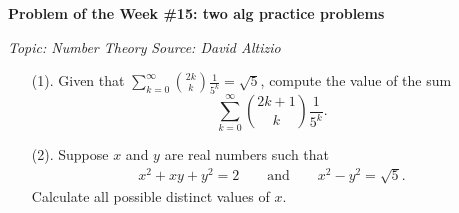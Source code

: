 \begin{potw}\vspace{5pt}
{\large\textbf{Problem of the Week \#15: two alg practice problems}}\vspace{5pt}

\textit{Topic: Number Theory}\newline
\textit{Source: David Altizio}\V

\begin{enumerate}
    \item [(1).] Given that $\sum_{k=0}^{\infty}\binom{2k}{k}\frac{1}{5^k}=\sqrt{5}$, compute the value of the sum 
    \[\sum_{k=0}^{\infty}\binom{2k+1}{k}\frac{1}{5^k}.\]
    \item [(2).] Suppose $x$ and $y$ are real numbers such that 
    \begin{align*}
        x^2+xy+y^2=2 \qquad\text{and} \qquad x^2-y^2=\sqrt{5}.
    \end{align*}
    Calculate all possible distinct values of $x$.
\end{enumerate}
\end{potw}\V
